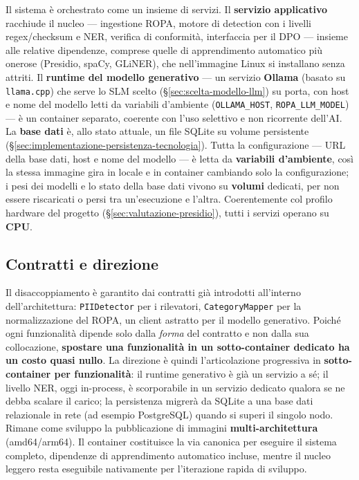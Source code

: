 Il sistema è orchestrato come un insieme di servizi. Il \textbf{servizio applicativo} racchiude il nucleo --- ingestione ROPA, motore di detection con i livelli regex/checksum e NER, verifica di conformità, interfaccia per il DPO --- insieme alle relative dipendenze, comprese quelle di apprendimento automatico più onerose (Presidio, spaCy, GLiNER), che nell'immagine Linux si installano senza attriti. Il \textbf{runtime del modello generativo} --- un servizio \textbf{Ollama} (basato su \texttt{llama.cpp}) che serve lo SLM scelto (§\ref{sec:scelta-modello-llm}) su porta, con host e nome del modello letti da variabili d'ambiente (\texttt{OLLAMA\_HOST}, \texttt{ROPA\_LLM\_MODEL}) --- è un container separato, coerente con l'uso selettivo e non ricorrente dell'AI. La \textbf{base dati} è, allo stato attuale, un file SQLite su volume persistente (§\ref{sec:implementazione-persistenza-tecnologia}). Tutta la configurazione --- URL della base dati, host e nome del modello --- è letta da \textbf{variabili d'ambiente}, così la stessa immagine gira in locale e in container cambiando solo la configurazione; i pesi dei modelli e lo stato della base dati vivono su \textbf{volumi} dedicati, per non essere riscaricati o persi tra un'esecuzione e l'altra. Coerentemente col profilo hardware del progetto (§\ref{sec:valutazione-presidio}), tutti i servizi operano su \textbf{CPU}.

\subsection{Contratti e direzione}
\label{sub:container-direzione}

Il disaccoppiamento è garantito dai contratti già introdotti all'interno dell'architettura: \texttt{PIIDetector} per i rilevatori, \texttt{CategoryMapper} per la normalizzazione del ROPA, un client astratto per il modello generativo. Poiché ogni funzionalità dipende solo dalla \textit{forma} del contratto e non dalla sua collocazione, \textbf{spostare una funzionalità in un sotto-container dedicato ha un costo quasi nullo}. La direzione è quindi l'articolazione progressiva in \textbf{sotto-container per funzionalità}: il runtime generativo è già un servizio a sé; il livello NER, oggi in-process, è scorporabile in un servizio dedicato qualora se ne debba scalare il carico; la persistenza migrerà da SQLite a una base dati relazionale in rete (ad esempio PostgreSQL) quando si superi il singolo nodo. Rimane come sviluppo la pubblicazione di immagini \textbf{multi-architettura} (amd64/arm64). Il container costituisce la via canonica per eseguire il sistema completo, dipendenze di apprendimento automatico incluse, mentre il nucleo leggero resta eseguibile nativamente per l'iterazione rapida di sviluppo.